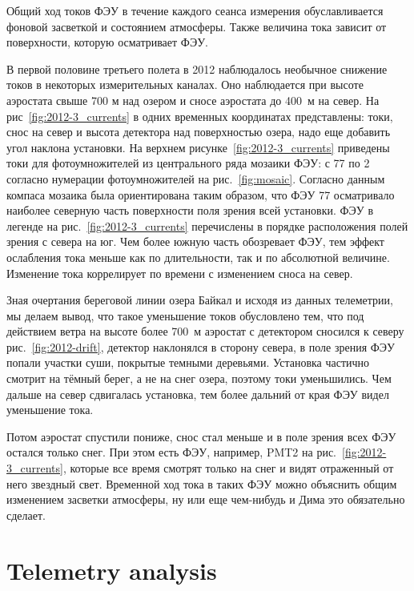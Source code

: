 \documentclass[final,5p,times,twocolumn]{elsarticle}
\begin{document}
{\Russian
Общий ход токов ФЭУ в течение каждого сеанса измерения обуславливается фоновой засветкой и состоянием атмосферы. Также величина тока зависит от поверхности, которую осматривает ФЭУ.

В первой половине третьего полета в 2012 наблюдалось необычное снижение токов в некоторых измерительных каналах. Оно наблюдается при высоте аэростата свыше 700 м над озером и сносе аэростата до 400~м на север. На рис~\ref{fig:2012-3_currents} в одних временных координатах представлены: токи, снос на север и высота детектора над поверхностью озера, надо еще добавить угол наклона установки. На верхнем рисунке~\ref{fig:2012-3_currents} приведены токи для фотоумножителей из центрального ряда мозаики ФЭУ: с 77 по 2 согласно нумерации фотоумножителей на рис.~\ref{fig:mosaic}. Согласно данным компаса мозаика была ориентирована таким образом, что ФЭУ 77 осматривало наиболее северную часть поверхности поля зрения всей установки. ФЭУ в легенде на рис.~\ref{fig:2012-3_currents} перечислены в порядке расположения полей зрения с севера на юг. Чем более южную часть обозревает ФЭУ, тем эффект ослабления тока меньше как по длительности, так и по абсолютной величине. Изменение тока коррелирует по времени с изменением сноса на север. 

Зная очертания береговой линии озера Байкал и исходя из данных телеметрии, мы делаем вывод, что такое уменьшение токов обусловлено тем, что под действием ветра на высоте более 700~м аэростат с детектором сносился к северу рис.~\ref{fig:2012-drift}, детектор наклонялся в сторону севера, в поле зрения ФЭУ попали участки суши, покрытые темными деревьями. Установка частично смотрит на тёмный берег, а не на снег озера, поэтому токи уменьшились. Чем дальше на север сдвигалась установка, тем более дальний от края ФЭУ видел уменьшение тока.  

Потом аэростат спустили пониже, снос стал меньше и в поле зрения всех ФЭУ остался только снег. 
При этом есть ФЭУ, например, PMT2 на рис.~\ref{fig:2012-3_currents}, которые все время смотрят только на снег и видят отраженный от него звездный свет. Временной ход тока в таких ФЭУ можно объяснить общим изменением засветки атмосферы, ну или еще чем-нибудь и Дима это обязательно сделает. 

}



\section{Telemetry analysis}
\end{document}
